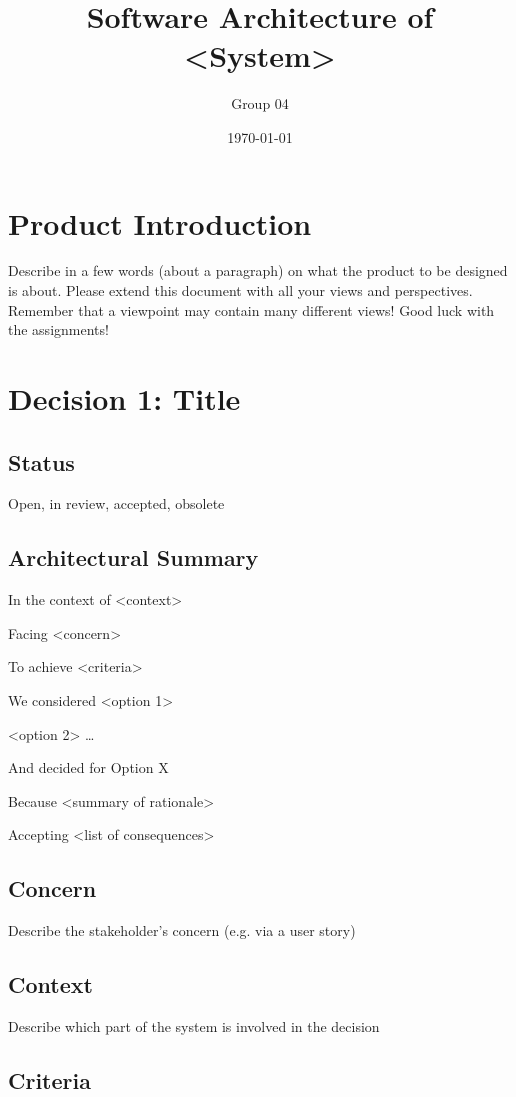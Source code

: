 \documentclass{article}
\title{Software Architecture of \textless{}System\textgreater{}}
\author{Group 04}
\date{\today}
\begin{document}
\maketitle
\newpage

\section*{Product Introduction}
Describe in a few words (about a paragraph) on what the product to be designed is about. Please extend this document with all your views and perspectives. Remember that a viewpoint may contain many different views! Good luck with the assignments!

\section*{Decision 1: Title}
\subsection*{Status}
Open, in review, accepted, obsolete

\subsection*{Architectural Summary}
In the context of \textless{}context\textgreater{}

Facing \textless{}concern\textgreater{}

To achieve \textless{}criteria\textgreater{}

We considered \textless{}option 1\textgreater{}

\textless{}option 2\textgreater{} \ldots

And decided for Option X

Because \textless{}summary of rationale\textgreater{}

Accepting \textless{}list of consequences\textgreater{}

\subsection*{Concern}
Describe the stakeholder’s concern (e.g. via a user story)

\subsection*{Context}
Describe which part of the system is involved in the decision

\subsection*{Criteria}
\end{document}
